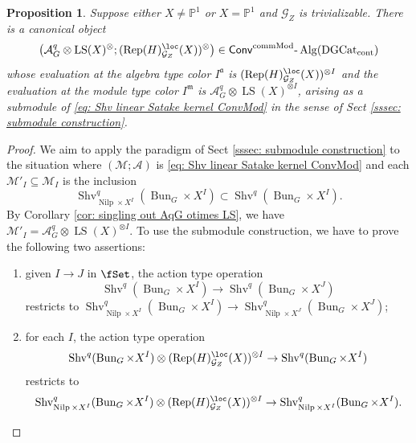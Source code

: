 \documentclass[10pt]{amsart}
\newtheorem{prop}[subsubsection]{Proposition}
\theoremstyle{remark}
\newcommand{\mf}[1]{\mathfrak{#1}}
\newcommand{\pjl}{\mathbb{P}^1}
\newcommand{\on}{\operatorname}
\newcommand{\cA}{\mathcal{A}}
\newcommand{\cG}{\mathcal{G}}
\newcommand{\cM}{\mathcal{M}}
\newcommand{\DGcat}{\on{DGCat}_{\on{cont}}}
\newcommand{\lAlg}{\text{-}\on{Alg}}
\newcommand{\Rep}{\on{Rep}}
\newcommand{\Shv}{\on{Shv}}
\newcommand{\Nilp}{\on{Nilp}}
\newcommand{\LS}{\on{LS}}
\newcommand{\Bun}{\on{Bun}}
\newcommand{\ConvcMod}{\mathsf{Conv}^{\on{commMod}}}
\begin{document}
\begin{prop}\label{prop: constructing ConvMod AqG}
    Suppose either $X\ne\pjl$ or $X=\pjl$ and $\cG_Z$ is trivializable.
    There is a canonical object
    \begin{equation}\label{eq: ConvMod AqG twRepH}
    \left(\cA^q_G\otimes \LS(X)^{\otimes}; (\Rep(H)^{\loc}_{\cG_Z}(X))^{\otimes}\right)\in \ConvcMod\lAlg(\DGcat)
\end{equation}
whose evaluation at the algebra type color $I^{\mf{a}}$ is $(\Rep(H)^{\loc}_{\cG_Z}(X))^{\otimes I}$ and the evaluation at the module type color $I^{\mf{m}}$ is $\cA^q_G\otimes \LS(X)^{\otimes I}$, arising as a submodule of \eqref{eq: Shv linear Satake kernel ConvMod} in the sense of Sect \ref{sssec: submodule construction}.
\end{prop}
\begin{proof}
    We aim to apply the paradigm of Sect \ref{sssec: submodule construction} to the situation where $(\cM;\cA)$ is \eqref{eq: Shv linear Satake kernel ConvMod} and each $\cM'_I\subseteq \cM_I$ is the inclusion
    \[\Shv^q_{\Nilp\times X^I}(\Bun_G\times X^I)\subset \Shv^q(\Bun_G\times X^I).\]
    By Corollary \ref{cor: singling out AqG otimes LS}, we have $\cM'_I=\cA^q_G\otimes \LS(X)^{\otimes I}$. To use the submodule construction, we have to prove the following two assertions:
    \begin{enumerate}
        \item given $I\rightarrow J$ in $\fSet$, the action type operation 
        \begin{equation}\label{eq: Shv q BunGXI functoriality}
            \Shv^q(\Bun_G\times X^I)\rightarrow \Shv^q(\Bun_G\times X^J)
        \end{equation}
        restricts to $\Shv^q_{\Nilp\times X^I}(\Bun_G\times X^I)\rightarrow \Shv^q_{\Nilp\times X^J}(\Bun_G\times X^J)$;
        \item for each $I$, the action type operation
        \begin{equation}\label{eq: action of met Sat kernel}
            \Shv^q(\Bun_G\times X^I)\otimes (\Rep(H)^{\loc}_{\cG_Z}(X))^{\otimes I}\rightarrow \Shv^q(\Bun_G\times X^I)
        \end{equation}
        restricts to
        \[\Shv^q_{\Nilp\times X^I}(\Bun_G\times X^I)\otimes (\Rep(H)^{\loc}_{\cG_Z}(X))^{\otimes I}\rightarrow \Shv^q_{\Nilp\times X^I}(\Bun_G\times X^I).\]
    \end{enumerate}
    

\end{proof}
\end{document}
